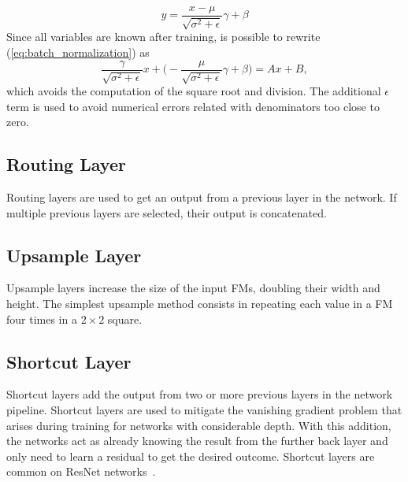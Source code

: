 
\begin{equation}
y = \frac{x - \mu}{\sqrt{\sigma^2 + \epsilon}}\gamma + \beta
\label{eq:batch_normalization}
\end{equation}
Since all variables are known after training, is possible to rewrite (\ref{eq:batch_normalization}) as 
\begin{equation}
\frac{\gamma}{\sqrt{\sigma^2 + \epsilon}}x + \Bigg(-\frac{\mu}{\sqrt{\sigma^2 + \epsilon}}\gamma + \beta  \Bigg) = Ax + B,
\label{eq:batch_normalization_macc}
\end{equation}
which avoids the computation of the square root and division.  The additional
$\epsilon$ term is used to avoid numerical errors related with denominators too
close to zero.

\subsection{Routing Layer}
\label{subsection:route_layer}
Routing layers are used to get an output from a previous layer in the network. If multiple previous layers are selected, their output is concatenated.

\subsection{Upsample Layer}
\label{subsection:upsample_layer}
Upsample layers increase the size of the input FMs, doubling their width and
height. The simplest upsample method consists in repeating each value in a FM
four times in a $2\times 2$ square.

\subsection{Shortcut Layer}
\label{subsection:shortcut_layer}
Shortcut layers add the output from two or more previous layers in the network
pipeline. Shortcut layers are used to mitigate the vanishing gradient problem
that arises during training for networks with considerable depth. With this
addition, the networks act as already knowing the result from the further back
layer and only need to learn a residual to get the desired outcome. Shortcut
layers are common on ResNet
networks~\cite{ResNet_2015DBLP:journals/corr/HeZRS15}.

